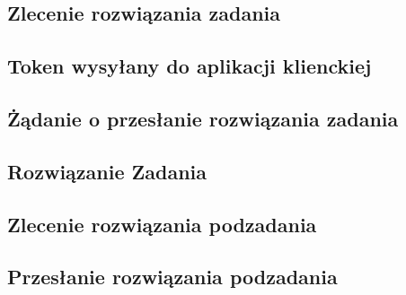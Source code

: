 \documentclass[12pt,a4paper,titlepage]{report}
\begin{document}
		\subsection{Zlecenie rozwiązania zadania}
			
		\subsection{Token wysyłany do aplikacji klienckiej}
			
		\subsection{Żądanie o przesłanie rozwiązania zadania}
			
		\subsection{Rozwiązanie Zadania}
			
		\subsection{Zlecenie rozwiązania podzadania}
			
		\subsection{Przesłanie rozwiązania podzadania}
			
\end{document}
